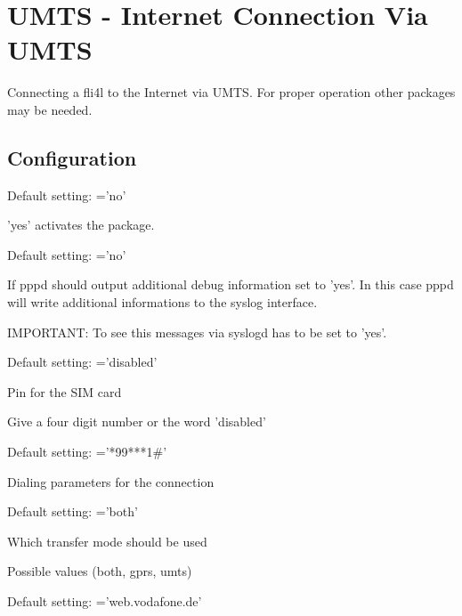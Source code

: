 {
\section {UMTS - Internet Connection Via UMTS}
}

Connecting a fli4l to the Internet via UMTS.
For proper operation other packages may be needed.

\subsection{Configuration}

\begin{description}


	Default setting:  ='no'

	'yes' activates the package.


	Default setting:  ='no'

	If pppd should output additional debug information set
	 to 'yes'. In this case pppd will write 
	additional informations to the syslog interface.

	IMPORTANT: To see this messages via syslogd  
	has to be set to 'yes'.



	Default setting:  ='disabled'

	Pin for the SIM card 

	Give a four digit number or the word 'disabled'


	Default setting:  ='*99***1\#'

	Dialing parameters for the connection


	Default setting:  ='both'

	Which transfer mode should be used

	Possible values (both, gprs, umts) 



	Default setting:  ='web.vodafone.de'


\end{description}
